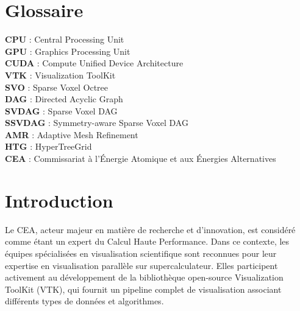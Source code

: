 \documentclass[12pt,a4paper,twoside]{article}
\begin{document}
    \newpage

    \section*{Glossaire}                             %
    \noindent
    \textbf{CPU} : Central Processing Unit \\
    \textbf{GPU} : Graphics Processing Unit \\
    \textbf{CUDA} : Compute Unified Device Architecture \\
    \textbf{VTK} : Visualization ToolKit \\
    \textbf{SVO} : Sparse Voxel Octree \\
    \textbf{DAG} : Directed Acyclic Graph \\
    \textbf{SVDAG} : Sparse Voxel DAG \\
    \textbf{SSVDAG} : Symmetry-aware Sparse Voxel DAG \\
    \textbf{AMR} : Adaptive Mesh Refinement \\
    \textbf{HTG} : HyperTreeGrid \\
    \textbf{CEA} : Commissariat à l'Énergie Atomique et aux Énergies Alternatives\\


    \newpage

    \renewcommand{\contentsname}{Sommaire}

    \tableofcontents


    \newpage

    \lstset{numbers=left, tabsize=3, frame=single, numberstyle=\ttfamily,
    basicstyle=\footnotesize}
    \thispagestyle{empty}

    \section{Introduction}                          %



    Le CEA, acteur majeur en matière de recherche et d’innovation, est considéré comme étant un expert du Calcul Haute
    Performance. Dans ce contexte, les équipes spécialisées en visualisation scientifique sont reconnues pour
    leur expertise en visualisation parallèle sur supercalculateur. Elles participent activement au développement de la
    bibliothèque open-source Visualization ToolKit (VTK), qui fournit un pipeline complet de visualisation associant différents types de données
    et algorithmes.
\end{document}
